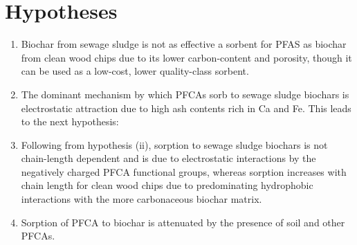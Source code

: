 \section{Hypotheses \label{sec:hypothesis}}
\begin{enumerate}[label=\roman*]
    \item Biochar from sewage sludge is not as effective a sorbent for PFAS as biochar from clean wood chips due to its lower carbon-content and porosity, though it can be used as a low-cost, lower quality-class sorbent.
    \item The dominant mechanism by which PFCAs sorb to sewage sludge biochars is electrostatic attraction due to high ash contents rich in Ca and Fe. This leads to the next hypothesis: 
    \item Following from hypothesis (ii), sorption to sewage sludge biochars is not chain-length dependent and is due to electrostatic interactions by the negatively charged PFCA functional groups, whereas sorption increases with chain length for clean wood chips due to predominating hydrophobic interactions with the more carbonaceous biochar matrix.
    \item Sorption of PFCA to biochar is attenuated by the presence of soil and other PFCAs. 
\end{enumerate} 



